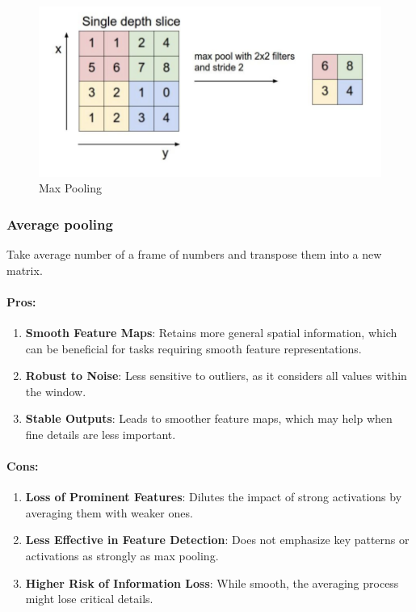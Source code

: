 \documentclass[11pt, english]{article}
\begin{document}
\begin{figure}[H]
    \centering
    \includegraphics[width=0.5\linewidth]{Screenshot 2025-01-28 at 7.43.17 PM.png}
    \caption{Max Pooling}
    \label{fig:enter-label}
\end{figure}
\subsubsection{Average pooling}
Take average number of a frame of numbers and transpose them into a new matrix.
\paragraph{\textbf{Pros}:}
\begin{enumerate}
    \item \textbf{Smooth Feature Maps}:
Retains more general spatial information, which can be beneficial for tasks requiring smooth feature representations.
    \item \textbf{Robust to Noise}:
Less sensitive to outliers, as it considers all values within the window.
    \item \textbf{Stable Outputs}:
Leads to smoother feature maps, which may help when fine details are less important.

\end{enumerate}
\paragraph{\textbf{Cons}:}
\begin{enumerate}
    \item \textbf{Loss of Prominent Features}:
Dilutes the impact of strong activations by averaging them with weaker ones.
    \item \textbf{Less Effective in Feature Detection}:
Does not emphasize key patterns or activations as strongly as max pooling.
    \item \textbf{Higher Risk of Information Loss}:
While smooth, the averaging process might lose critical details.

\end{enumerate}
\end{document}
